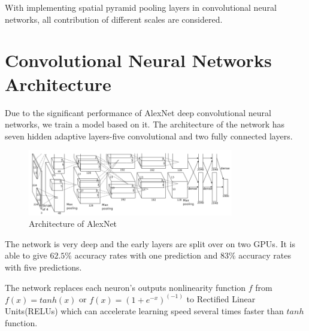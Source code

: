 With implementing spatial pyramid pooling layers in convolutional neural networks, all contribution of different scales are considered.

\section{Convolutional Neural Networks Architecture}

Due to the significant performance of AlexNet \citep{krizhevsky2012imagenet} deep convolutional neural networks, we train a model based on it. The architecture of the network has seven hidden adaptive layers-five convolutional and two fully connected layers.
\begin{figure}[htb]
    \centering
	\includegraphics[width=0.8\textwidth]{AlexNet.png}
    \caption{Architecture of AlexNet}%
    \label{fig:ImageNetArch}%
\end{figure}
The network is very deep and the early layers are split over on two GPUs. It is able to give $62.5\%$ accuracy rates with one prediction and $83\%$ accuracy rates with five predictions.

The network replaces each neuron's outputs nonlinearity function $f$ from $f(x) = tanh(x)$ or $f(x) = (1 + e^{-x})^(-1)$ to Rectified Linear Units(RELUs)\citep{nair2010rectified} which can accelerate learning speed several times faster than $tanh$ function. 

